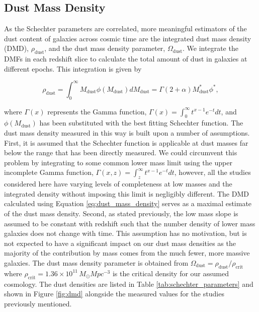 \subsection{Dust Mass Density}

As the Schechter parameters are correlated, more meaningful estimators of the dust content of galaxies across cosmic time are the integrated dust mass density (DMD), $\rho_{\textrm{dust}}$, and the dust mass density parameter, $\Omega_{\textrm{dust}}$. We integrate the DMFs in each redshift slice to calculate the total amount of dust in galaxies at different epochs. This integration is given by

\begin{equation}
    \rho_{\textrm{dust}} = \int_0^\infty M_{\textrm{dust}} \phi(M_{\textrm{dust}}) dM_{\textrm{dust}} = \Gamma(2+\alpha) M_{\textrm{dust}}^* \phi^*,
    \label{eq:dust_mass_density}
\end{equation}

\noindent where $\Gamma(x)$ represents the Gamma function, $\Gamma(x) = \int_0^\infty t^{x-1}e^{-t} dt$, and $\phi(M_{\textrm{dust}})$ has been substituted with the best fitting Schechter function. The dust mass density measured in this way is built upon a number of assumptions. First, it is assumed that the Schechter function is applicable at dust masses far below the range that has been directly measured. We could circumvent this problem by integrating to some common lower mass limit using the upper incomplete Gamma function, $\Gamma(x, z) = \int_z^\infty t^{x-1}e^{-t} dt$, however, all the studies considered here have varying levels of completeness at low masses and the integrated density without imposing this limit is negligibly different. The DMD calculated using Equation \ref{eq:dust_mass_density} serves as a maximal estimate of the dust mass density. Second, as stated previously, the low mass slope is assumed to be constant with redshift such that the number density of lower mass galaxies does not change with time. This assumption has no motivation, but is not expected to have a significant impact on our dust mass densities as the majority of the contribution by mass comes from the much fewer, more massive galaxies. The dust mass density parameter is obtained from $\Omega_{\textrm{dust}} = \rho_{\textrm{dust}}/\rho_{\textrm{crit}}$ where $\rho_{\textrm{crit}} = 1.36\times10^{11}\,M_{\odot}Mpc^{-3}$ is the critical density for our assumed cosmology. The dust densities are listed in Table \ref{tab:schechter_parameters} and shown in Figure \ref{fig:dmd} alongside the measured values for the studies previously mentioned. 


